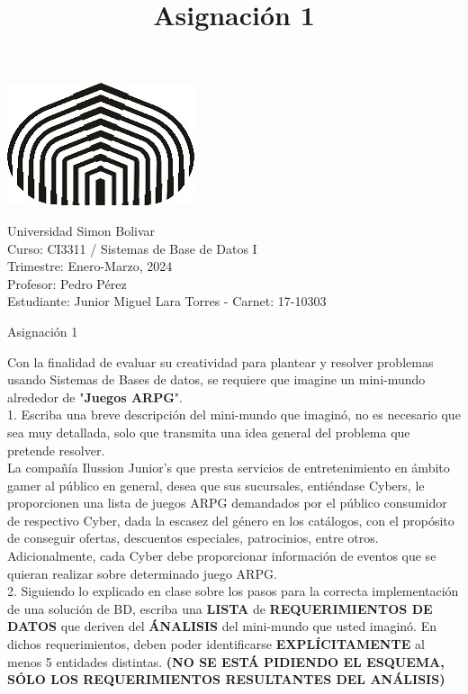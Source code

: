 \documentclass[a4paper,12pt]{article}
\title{Asignación 1}
\begin{document}
\begin{center}
\par \includegraphics[scale=1]{USB} \par
Universidad Simon Bolivar \\ Curso: CI3311 / Sistemas de Base de Datos I \\ Trimestre: Enero-Marzo, 2024 \\ Profesor: Pedro Pérez \\ Estudiante: Junior Miguel Lara Torres - Carnet: 17-10303 \\
\end{center}

\begin{center}
Asignación 1
\end{center}

Con la finalidad de evaluar su creatividad para plantear y resolver problemas usando Sistemas de Bases de datos, se requiere que imagine un mini-mundo alrededor de "\textbf{Juegos ARPG}". \\

1. Escriba una breve descripción del mini-mundo que imaginó, no es necesario que sea muy detallada, solo que transmita una idea general del problema que pretende resolver. \\

La compañía Ilussion Junior's que presta servicios de entretenimiento en ámbito gamer al público en general, desea que sus sucursales, entiéndase Cybers, le proporcionen una lista de juegos ARPG demandados por el público consumidor de respectivo Cyber, dada la escasez del género en los catálogos, con el propósito de conseguir ofertas, descuentos especiales, patrocinios, entre otros. Adicionalmente, cada Cyber debe proporcionar información de eventos que se quieran realizar sobre determinado juego ARPG. \\

2.  Siguiendo lo explicado en clase sobre los pasos para la correcta implementación de una solución de BD, escriba una \textbf{LISTA} de \textbf{REQUERIMIENTOS DE DATOS} que deriven del \textbf{ÁNALISIS} del mini-mundo que usted imaginó. En dichos requerimientos, deben poder identificarse \textbf{EXPLÍCITAMENTE} al menos 5 entidades distintas. \textbf{(NO SE ESTÁ PIDIENDO EL ESQUEMA, SÓLO LOS REQUERIMIENTOS RESULTANTES DEL ANÁLISIS)} \\
\end{document}
